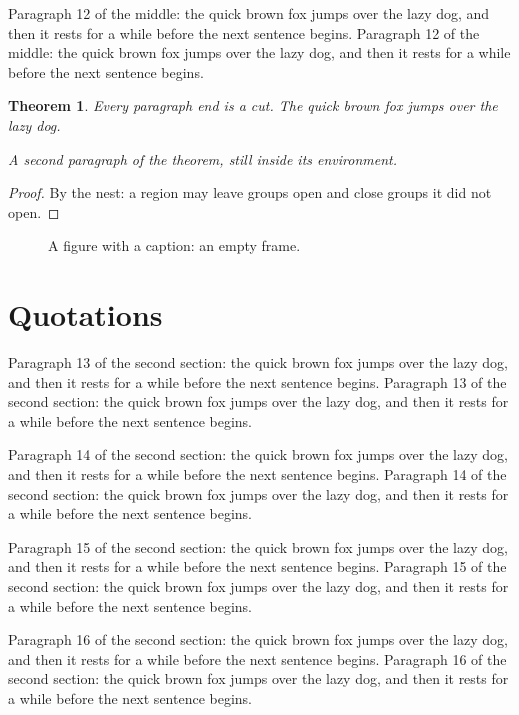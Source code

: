 \documentclass{article}
\newtheorem{theorem}{Theorem}
\begin{document}
Paragraph 12 of the middle: the quick brown fox jumps over the lazy dog, and then it rests for a while before the next sentence begins. Paragraph 12 of the middle: the quick brown fox jumps over the lazy dog, and then it rests for a while before the next sentence begins. 

\begin{theorem}
Every paragraph end is a cut. The quick brown fox jumps over the lazy dog.

A second paragraph of the theorem, still inside its environment.
\end{theorem}
\begin{proof}
By the nest: a region may leave groups open and close groups it did not open.
\end{proof}

\begin{figure}[t]
\centering
\fbox{\rule{0pt}{2cm}\hspace{4cm}}
\caption{A figure with a caption: an empty frame.}
\end{figure}

\section{Quotations}
Paragraph 13 of the second section: the quick brown fox jumps over the lazy dog, and then it rests for a while before the next sentence begins. Paragraph 13 of the second section: the quick brown fox jumps over the lazy dog, and then it rests for a while before the next sentence begins. 

Paragraph 14 of the second section: the quick brown fox jumps over the lazy dog, and then it rests for a while before the next sentence begins. Paragraph 14 of the second section: the quick brown fox jumps over the lazy dog, and then it rests for a while before the next sentence begins. 

Paragraph 15 of the second section: the quick brown fox jumps over the lazy dog, and then it rests for a while before the next sentence begins. Paragraph 15 of the second section: the quick brown fox jumps over the lazy dog, and then it rests for a while before the next sentence begins. 

Paragraph 16 of the second section: the quick brown fox jumps over the lazy dog, and then it rests for a while before the next sentence begins. Paragraph 16 of the second section: the quick brown fox jumps over the lazy dog, and then it rests for a while before the next sentence begins. 
\end{document}
